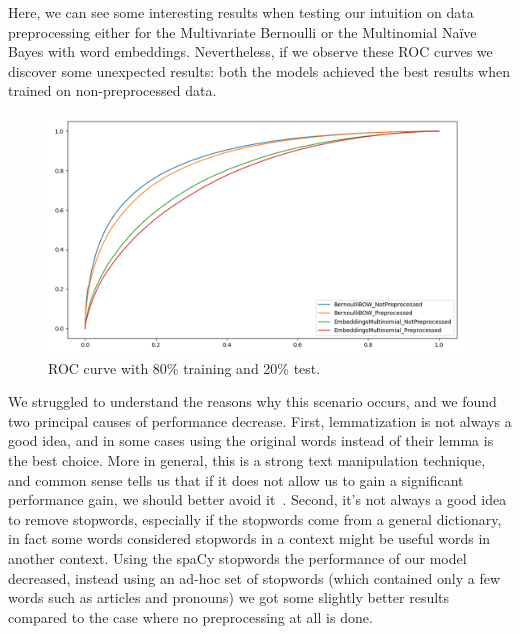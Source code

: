 Here, we can see some interesting results when testing our intuition on data preprocessing either for the Multivariate Bernoulli or the Multinomial Naïve Bayes with word embeddings. Nevertheless, if we observe these ROC curves we discover some unexpected results: both the models achieved the best results when trained on non-preprocessed data.
\clearpage


\begin{figure}[h!t]
    \centering
    \includegraphics[width=11cm]{../experiments/plots/preprocessing.png}
    \caption{ROC curve with 80\% training and 20\% test.}
    \label{fig:PREPROCESSING_ROC}
\end{figure}



We struggled to understand the reasons why this scenario occurs, and we found two principal causes of performance decrease. First, lemmatization is not always a good idea, and in some cases using the original words instead of their lemma is the best choice. More in general, this is a strong text manipulation technique, and common sense tells us that if it does not allow us to gain a significant performance gain, we should better avoid it~\cite{data:lemmatization_tips}. Second, it's not always a good idea to remove stopwords, especially if the stopwords come from a general dictionary, in fact some words considered stopwords in a context might be useful words in another context. Using the spaCy stopwords the performance of our model decreased, instead using an ad-hoc set of stopwords (which contained only a few words such as articles and pronouns) we got some slightly better results compared to the case where no preprocessing at all is done.\\


